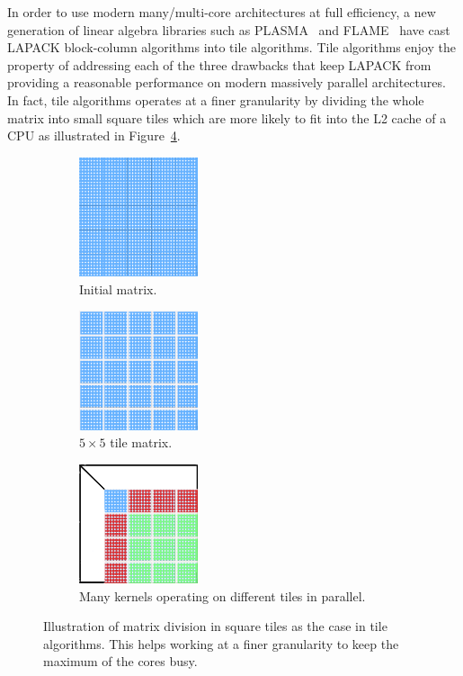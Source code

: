 In order to use modern many/multi-core architectures at full
efficiency, a new generation of linear algebra libraries such as
PLASMA~\cite{DBLP:journals/corr/abs-0709-1272} and FLAME~\cite{FLAWN3}
have cast LAPACK block-column algorithms into tile algorithms. Tile
algorithms enjoy the property of addressing each of the three
drawbacks that keep LAPACK from providing a reasonable performance on
modern massively parallel architectures. In fact, tile algorithms
operates at a finer granularity by dividing the whole matrix into
small square tiles which are more likely to fit into the L2 cache of a
CPU as illustrated in Figure~\ref{fig:tile_algo}.
\begin{figure}[th]
  \captionsetup[subfigure]{justification=justified,singlelinecheck=false}
  \begin{subfigure}[t]{0.3 \textwidth}
    \includegraphics[width=3.5cm, height=3.5cm]{fig/one-sided-initial}
    \caption{\label{fig:initial_matrix}Initial matrix.}
  \end{subfigure}
  \hfill
  \begin{subfigure}[t]{0.3 \textwidth}
    \includegraphics[width=3.5cm, height=3.5cm]{fig/one-sided-tile}
    \caption{\label{fig:tile_matrix}
      $5\times 5$ tile matrix.}
  \end{subfigure}
  \hfill
    \begin{subfigure}[t]{0.3 \textwidth}
    \includegraphics[width=3.5cm, height=3.5cm]{fig/one-sided-tile-facto}
    \caption{\label{fig:tile_facto}
     Many kernels operating on different tiles in parallel.}
  \end{subfigure}
  \caption{Illustration of matrix division in square tiles as the case
    in tile algorithms. This helps working at  a finer granularity to
    keep the maximum of the cores busy.}
    \label{fig:tile_algo}
\end{figure}

